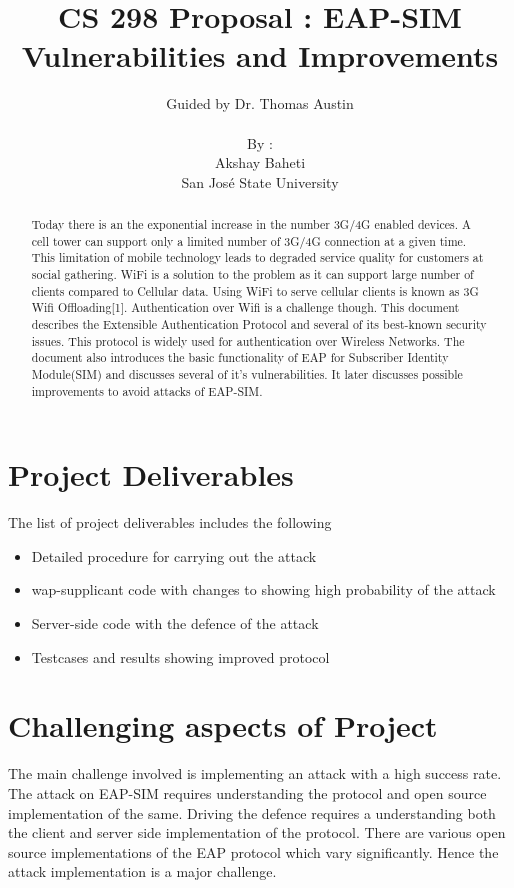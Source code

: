 \documentclass{article}
\title{CS 298 Proposal : EAP-SIM Vulnerabilities and Improvements}
\author{	
   Guided by Dr. Thomas Austin\\
   \\
   By : \\
   Akshay Baheti \\
   San Jos\'{e} State University \\
}
\begin{document}
\maketitle
\begin{abstract}
Today there is an the exponential increase in the number 3G/4G enabled devices. A cell
tower can support only a limited number of 3G/4G connection at a given time. This limitation of mobile technology leads to degraded service quality for customers at social gathering. WiFi is a solution to the problem as it can support large number of clients compared to Cellular data. Using WiFi to serve cellular clients is known as 3G Wifi Offloading[1]. Authentication over Wifi is a challenge though. This document describes the Extensible Authentication Protocol and several of its best-known security issues. This protocol is widely used for authentication over Wireless Networks. The document also introduces the basic functionality of EAP for Subscriber Identity Module(SIM) and discusses several of it's vulnerabilities. It later discusses possible improvements to avoid attacks of EAP-SIM.
\end{abstract}
\section{Project Deliverables}
\label{sec:Section 1}
The list of project deliverables includes the following
\begin{itemize}
 \item Detailed procedure for carrying out the attack
 \item wap-supplicant code with changes to showing high probability of the attack
 \item Server-side code with the defence of the attack
 \item Testcases and results showing improved protocol
\end{itemize}
\section{Challenging aspects of Project}
\label{sec:Section 2}
The main challenge involved is implementing an attack with a high success rate. The attack on EAP-SIM requires understanding the protocol and open source implementation of the same. Driving the defence requires a understanding both the client and server side implementation of the protocol. There are various open source implementations of the EAP protocol which vary significantly. Hence the attack implementation is a major challenge. 
\end{document}
